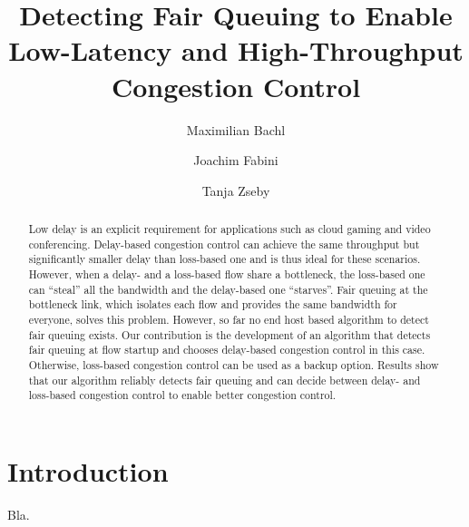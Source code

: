 \documentclass[runningheads]{llncs}
\begin{document}
%
\title{Detecting Fair Queuing to Enable Low-Latency and High-Throughput Congestion Control}
%
%
\author{Maximilian Bachl \and
Joachim Fabini \and
Tanja Zseby}
%
%
%
\maketitle              %
%
\begin{abstract}
Low delay is an explicit requirement for applications such as cloud gaming and video conferencing. Delay-based congestion control can achieve the same throughput but significantly smaller delay than loss-based one and is thus ideal for these scenarios. However, when a delay- and a loss-based flow share a bottleneck, the loss-based one can ``steal'' all the bandwidth and the delay-based one ``starves''. Fair queuing at the bottleneck link, which isolates each flow and provides the same bandwidth for everyone, solves this problem. However, so far no end host based algorithm to detect fair queuing exists. Our contribution is the development of an algorithm that detects fair queuing at flow startup and chooses delay-based congestion control in this case. Otherwise, loss-based congestion control can be used as a backup option. Results show that our algorithm reliably detects fair queuing and can decide between delay- and loss-based congestion control to enable better congestion control. 

\end{abstract}
%
%
%
\section{Introduction}

Bla. 


\end{document}

